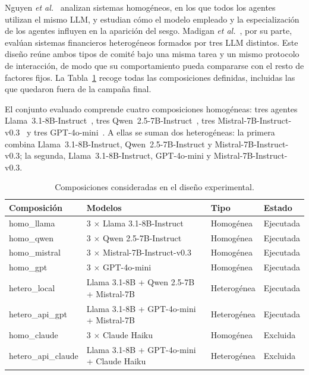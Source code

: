 Nguyen \textit{et al.}~\cite{nguyen2025social} analizan sistemas homogéneos, en los que todos los agentes utilizan el mismo LLM, y estudian cómo el modelo empleado y la especialización de los agentes influyen en la aparición del sesgo. Madigan \textit{et al.}~\cite{madigan2025emergent}, por su parte, evalúan sistemas financieros heterogéneos formados por tres LLM distintos. Este diseño reúne ambos tipos de comité bajo una misma tarea y un mismo protocolo de interacción, de modo que su comportamiento pueda compararse con el resto de factores fijos. La Tabla~\ref{tab:composiciones} recoge todas las composiciones definidas, incluidas las que quedaron fuera de la campaña final.

El conjunto evaluado comprende cuatro composiciones homogéneas: tres agentes Llama~3.1-8B-Instruct~\cite{grattafiori2024llama}, tres Qwen~2.5-7B-Instruct~\cite{yang2024qwen25}, tres Mistral-7B-Instruct-v0.3~\cite{mistral2024v03} y tres GPT-4o-mini~\cite{openai2024gpt4omini}. A ellas se suman dos heterogéneas: la primera combina Llama~3.1-8B-Instruct, Qwen~2.5-7B-Instruct y Mistral-7B-Instruct-v0.3; la segunda, Llama~3.1-8B-Instruct, GPT-4o-mini y Mistral-7B-Instruct-v0.3.

\begin{table}[htbp]
	\centering
	\caption{Composiciones consideradas en el diseño experimental.}
	\label{tab:composiciones}
	\small
	\begin{tabular}{p{2.8cm} p{6.8cm} p{2.2cm} p{2.0cm}}
		\hline
		\textbf{Composición} & \textbf{Modelos} & \textbf{Tipo} & \textbf{Estado} \\
		\hline
		homo\_llama
		& 3 $\times$ Llama 3.1-8B-Instruct
		& Homogénea & Ejecutada \\
		
		homo\_qwen
		& 3 $\times$ Qwen 2.5-7B-Instruct
		& Homogénea & Ejecutada \\
		
		homo\_mistral
		& 3 $\times$ Mistral-7B-Instruct-v0.3
		& Homogénea & Ejecutada \\
		
		homo\_gpt
		& 3 $\times$ GPT-4o-mini
		& Homogénea & Ejecutada \\
		
		hetero\_local
		& Llama 3.1-8B + Qwen 2.5-7B + Mistral-7B
		& Heterogénea & Ejecutada \\
		
		hetero\_api\_gpt
		& Llama 3.1-8B + GPT-4o-mini + Mistral-7B
		& Heterogénea & Ejecutada \\
		
		homo\_claude
		& 3 $\times$ Claude Haiku
		& Homogénea & Excluida \\
		
		hetero\_api\_claude
		& Llama 3.1-8B + GPT-4o-mini + Claude Haiku
		& Heterogénea & Excluida \\
		\hline
	\end{tabular}
\end{table}
\FloatBarrier

